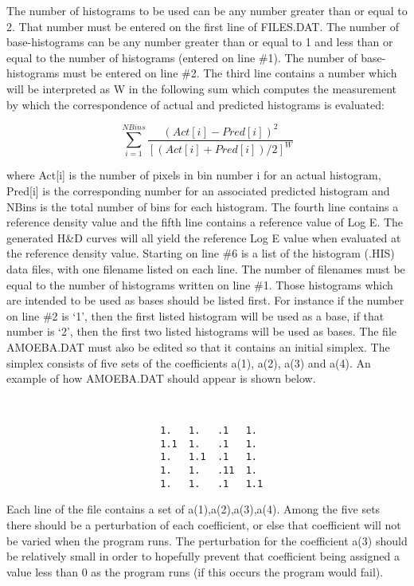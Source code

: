       The number of histograms to be used can be any number greater than
   or equal to 2.  That number must be entered on the first line of
   FILES.DAT.  The number of base-histograms can be any number greater
   than or equal to 1 and less than or equal to the number of histograms
   (entered on line \#1).  The number of base-histograms must be entered on
   line \#2.  The third line contains a number which will be interpreted as
   W in the following sum which computes the measurement by which the
   correspondence of actual and predicted histograms is evaluated:
\begin{center}
\begin{displaymath}
 \sum_{i=1}^{NBins} \frac{(Act[i]-Pred[i])^{2}}{[(Act[i]+Pred[i])/2]^{W}}
\end{displaymath}
\end{center}
   where Act[i] is the number of pixels in bin number i for an actual
   histogram, Pred[i] is the corresponding number for an associated
   predicted histogram and NBins is the total number of bins for each
   histogram.
      The fourth line contains a reference density value and the fifth line
   contains a reference value of Log E.  The generated H\&D curves will all
   yield the reference Log E value when evaluated at the reference density
   value.
      Starting on line \#6 is a list of the histogram (.HIS) data files,
   with one filename listed on each line.  The number of filenames must be
   equal to the number of histograms written on line \#1.  Those histograms
   which are intended to be used as bases should be listed first.  For
   instance if the number on line \#2 is `1', then the first listed
   histogram will be used as a base, if that number is `2', then the first
   two listed histograms will be used as bases.
      The file AMOEBA.DAT must also be edited so that it contains an
   initial simplex.  The simplex consists of five sets of the coefficients
   a(1), a(2), a(3) and a(4).  An example of how AMOEBA.DAT should appear
   is shown below.
\begin{center}
\begin{verbatim}


                           1.   1.   .1   1.
                           1.1  1.   .1   1.
                           1.   1.1  .1   1.
                           1.   1.   .11  1.
                           1.   1.   .1   1.1

\end{verbatim}
\end{center}
      Each line of the file contains a set of {a(1),a(2),a(3),a(4)}.
   Among the five sets there should be a perturbation of each coefficient,
   or else that coefficient will not be varied when the program runs.  The
   perturbation for the coefficient a(3) should be relatively small in
   order to hopefully prevent that coefficient being assigned a value less
   than 0 as the program runs (if this occurs the program would fail).

